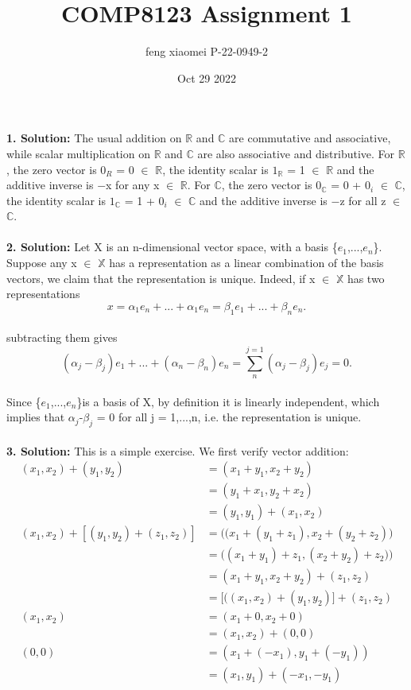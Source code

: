 \documentclass{article}
\title{COMP8123 \quad Assignment 1}
\author{feng xiaomei \quad P-22-0949-2}
\date{Oct 29 2022}
\begin{document}
\maketitle

\textbf{1. Solution: }The usual addition on $\mathbb{R}$ and $\mathbb{C}$ are commutative and associative, while scalar multiplication on $\mathbb{R}$ and $\mathbb{C}$ are also associative and distributive. For $\mathbb{R}$, the zero vector is {$0_R$} = 0 $\in$ $\mathbb{R}$, the identity scalar is {$1_\mathbb{R}$} = 1 $\in$ $\mathbb{R}$ and the additive inverse is $-$x for any x $\in$ $\mathbb{R}$. For $\mathbb{C}$, the zero vector is {$0_\mathbb{C}$} = 0 + {$0_i$} $\in$ $\mathbb{C}$, the identity scalar is {$1_\mathbb{C}$} = 1 + {$0_i$} $\in$ $\mathbb{C}$ and the additive inverse is $-$z for all z $\in$ $\mathbb{C}$.
\\
\\
\textbf{2. Solution: } Let X is an n-dimensional vector space, with a basis \{{$e_1$},...,{$e_n$}\}. Suppose any x $\in$ $\mathbb{X}$ has a representation as a linear combination of the basis vectors, we claim that the representation is unique. Indeed, if x $\in$ $\mathbb{X}$ has two representations
$$
x = {\alpha_1}{e_n}+...+{\alpha_1}{e_n}={\beta_1}{e_1}+...+{\beta_n}{e_n}.
$$
\\
subtracting them gives
\\
$$
({\alpha_j}-{\beta_j}){e_1}+...+({\alpha_n}-{\beta_n}){e_n}=\sum_{n}^{j=1}({\alpha_j}-{\beta_j}){e_j}=0.
$$
\\
Since \{{$e_1$},...,{$e_n$}\}is a basis of X, by definition it is linearly independent, which implies that {$\alpha_j$}-{$\beta_j$} = 0 for all j = 1,...,n, i.e. the representation is unique.
\\
\\
\textbf{3. Solution: } This is a simple exercise. We first verify vector addition:
\\
\begin{align*}
    ({x_1},{x_2})+({y_1},{y_2})&=({x_1}+{y_1},{x_2}+{y_2})\\
    &= ({y_1}+{x_1},{y_2}+{x_2})\\
    &= ({y_1},{y_1})+({x_1},{x_2})\\
    ({x_1},{x_2})+[({y_1},{y_2})+({z_1},{z_2})]&=\Big(({x_1}+({y_1}+{z_1}),{x_2}+({y_2}+{z_2})\Big)\\
    &=\Big(({x_1}+{y_1})+{z_1},({x_2}+{y_2})+{z_2})\Big)\\
    &=({x_1}+{y_1},{x_2}+{y_2})+({z_1},{z_2})\\
    &=\Big[(({x_1},{x_2})+({y_1},{y_2})\Big]+({z_1},{z_2})\\
    ({x_1},{x_2})&=({x_1}+0,{x_2}+0)\\
    &=({x_1},{x_2})+(0,0)\\
    (0,0)&=({x_1}+({-x_1}),{y_1}+(-{y_1}))\\
    &=({x_1},{y_1})+(-{x_1},-{y_1})\\
\end{align*}
\end{document}
